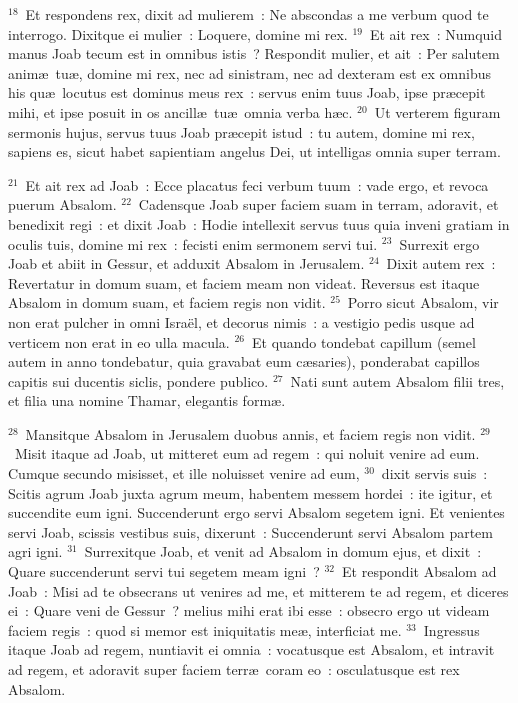 ${}^{18}$~Et respondens rex, dixit ad mulierem~: Ne abscondas a me verbum quod te interrogo. Dixitque ei mulier~: Loquere, domine mi rex.
${}^{19}$~Et ait rex~: Numquid manus Joab tecum est in omnibus istis~? Respondit mulier, et ait~: Per salutem anim\ae\ tu\ae , domine mi rex, nec ad sinistram, nec ad dexteram est ex omnibus his qu\ae\ locutus est dominus meus rex~: servus enim tuus Joab, ipse pr\ae cepit mihi, et ipse posuit in os ancill\ae\ tu\ae\ omnia verba h\ae c.
${}^{20}$~Ut verterem figuram sermonis hujus, servus tuus Joab pr\ae cepit istud~: tu autem, domine mi rex, sapiens es, sicut habet sapientiam angelus Dei, ut intelligas omnia super terram.


${}^{21}$~Et ait rex ad Joab~: Ecce placatus feci verbum tuum~: vade ergo, et revoca puerum Absalom.
${}^{22}$~Cadensque Joab super faciem suam in terram, adoravit, et benedixit regi~: et dixit Joab~: Hodie intellexit servus tuus quia inveni gratiam in oculis tuis, domine mi rex~: fecisti enim sermonem servi tui.
${}^{23}$~Surrexit ergo Joab et abiit in Gessur, et adduxit Absalom in Jerusalem.
${}^{24}$~Dixit autem rex~: Revertatur in domum suam, et faciem meam non videat. Reversus est itaque Absalom in domum suam, et faciem regis non vidit.
${}^{25}$~Porro sicut Absalom, vir non erat pulcher in omni Isra\"el, et decorus nimis~: a vestigio pedis usque ad verticem non erat in eo ulla macula.
${}^{26}$~Et quando tondebat capillum (semel autem in anno tondebatur, quia gravabat eum c\ae saries), ponderabat capillos capitis sui ducentis siclis, pondere publico.
${}^{27}$~Nati sunt autem Absalom filii tres, et filia una nomine Thamar, elegantis form\ae .


${}^{28}$~Mansitque Absalom in Jerusalem duobus annis, et faciem regis non vidit.
${}^{29}$~Misit itaque ad Joab, ut mitteret eum ad regem~: qui noluit venire ad eum. Cumque secundo misisset, et ille noluisset venire ad eum,
${}^{30}$~dixit servis suis~: Scitis agrum Joab juxta agrum meum, habentem messem hordei~: ite igitur, et succendite eum igni. Succenderunt ergo servi Absalom segetem igni. Et venientes servi Joab, scissis vestibus suis, dixerunt~: Succenderunt servi Absalom partem agri igni.
${}^{31}$~Surrexitque Joab, et venit ad Absalom in domum ejus, et dixit~: Quare succenderunt servi tui segetem meam igni~?
${}^{32}$~Et respondit Absalom ad Joab~: Misi ad te obsecrans ut venires ad me, et mitterem te ad regem, et diceres ei~: Quare veni de Gessur~? melius mihi erat ibi esse~: obsecro ergo ut videam faciem regis~: quod si memor est iniquitatis me\ae , interficiat me.
${}^{33}$~Ingressus itaque Joab ad regem, nuntiavit ei omnia~: vocatusque est Absalom, et intravit ad regem, et adoravit super faciem terr\ae\ coram eo~: osculatusque est rex Absalom.

